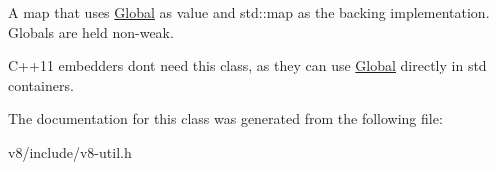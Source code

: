 A map that uses \hyperlink{classv8_1_1Global}{Global} as value and std\+::map as the backing implementation. Globals are held non-\/weak.

C++11 embedders don\textquotesingle{}t need this class, as they can use \hyperlink{classv8_1_1Global}{Global} directly in std containers. 

The documentation for this class was generated from the following file\+:\begin{DoxyCompactItemize}
\item 
v8/include/v8-\/util.\+h\end{DoxyCompactItemize}
